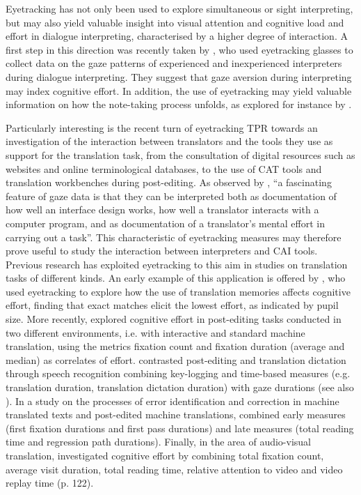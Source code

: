 Eyetracking has not only been used to explore simultaneous or sight interpreting, but may also yield valuable insight into visual attention and cognitive load and effort in dialogue interpreting, characterised by a higher degree of interaction. A first step in this direction was recently taken by \citet{tiselius_gaze_2020}, who used eyetracking glasses to collect data on the gaze patterns of experienced and inexperienced interpreters during dialogue interpreting. They suggest that gaze aversion during interpreting may index cognitive effort. In addition, the use of eyetracking may yield valuable information on how the note-taking process unfolds, as explored for instance by \citet{kuang_computerized_2019}.

Particularly interesting is the recent turn of eyetracking TPR towards an investigation of the interaction between translators and the tools they use as support for the translation task, from the consultation of digital resources such as websites and online terminological databases, to the use of CAT tools and translation workbenches during post-editing. As observed by \citet[403]{jakobsen_translation_2020}, ``a fascinating feature of gaze data is that they can be interpreted both as documentation of how well an interface design works, how well a translator interacts with a computer program, and as documentation of a translator's mental effort in carrying out a task''. This characteristic of eyetracking measures may therefore prove useful to study the interaction between interpreters and CAI tools. Previous research has exploited eyetracking to this aim in studies on translation tasks of different kinds. An early example of this application is offered by \citet{obrien_pauses_2006}, who used eyetracking to explore how the use of translation memories affects cognitive effort, finding that exact matches elicit the lowest effort, as indicated by pupil size. More recently, \citet{alves_investigating_2016} explored cognitive effort in post-editing tasks conducted in two different environments, i.e. with interactive and standard machine translation, using the metrics fixation count and fixation duration (average and median) as correlates of effort. \citet{carl-etal-2016-english} contrasted post-editing and translation dictation through speech recognition combining key-logging and time-based measures (e.g. translation duration, translation dictation duration) with gaze durations (see also \citealt{carl_comparing_2016}). In a study on the processes of error identification and correction in machine translated texts and post-edited machine translations, \citet{vardaro_translation_2019} combined early measures (first fixation durations and first pass durations) and late measures (total reading time and regression path durations). Finally, in the area of audio-visual translation, \citet{tardel_attention_2021} investigated cognitive effort by combining total fixation count, average visit duration, total reading time, relative attention to video and video replay time (p. 122).
